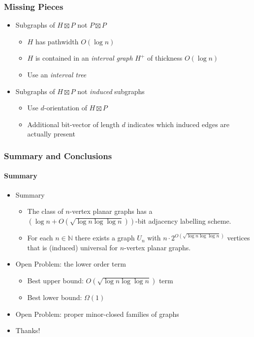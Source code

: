 \documentclass[xcolor=dvipsnames]{beamer}
\newcommand{\N}{\mathbb{N}}
\begin{document}
\begin{frame}
    \frametitle{Missing Pieces}

    \begin{itemize}[<+->]
        \item Subgraphs of $H\boxtimes P$ not $P\boxtimes P$
        \begin{itemize}
            \item $H$ has pathwidth $O(\log n)$
            \item $H$ is contained in an \emph{interval graph} $H^+$ of thickness $O(\log n)$
            \item Use an \emph{interval tree}
        \end{itemize}

        \item Subgraphs of $H\boxtimes P$ not \emph{induced} subgraphs
        \begin{itemize}
            \item Use $d$-orientation of $H\boxtimes P$
            \item Additional bit-vector of length $d$ indicates which induced edges are actually present
        \end{itemize}
    \end{itemize}
\end{frame}


\begin{frame}
    \frametitle{Summary and Conclusions}
    \framesubtitle{Summary}

    \begin{itemize}[<+->]
        \item Summary
        \begin{itemize}
            \item The class of $n$-vertex planar graphs has a $(\log n + O(\sqrt{\log n\log\log n}))$-bit adjacency labelling scheme.

            \item For each $n\in\N$ there exists a graph $U_n$ with $n\cdot 2^{O(\sqrt{\log n\log\log n})}$ vertices that is (induced) universal for $n$-vertex planar graphs.
        \end{itemize}
        \item Open Problem: the lower order term
        \begin{itemize}
            \item Best upper bound: $O(\sqrt{\log n\log\log n})$ term
            \item Best lower bound: $\Omega(1)$
        \end{itemize}
        \item Open Problem: proper minor-closed families of graphs
        \item Thanks!
    \end{itemize}
\end{frame}
\end{document}
